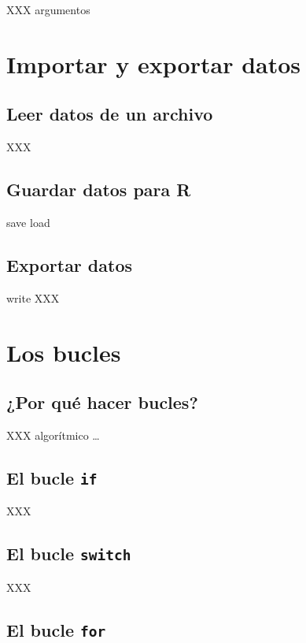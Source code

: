 \documentclass[]{book}
\begin{document}
XXX argumentos

\chapter{Importar y exportar datos}\label{import}

\section{Leer datos de un archivo}\label{leer-datos-de-un-archivo}

XXX

\section{Guardar datos para R}\label{guardar-datos-para-r}

save load

\section{Exportar datos}\label{exportar-datos}

write XXX

\chapter{Los bucles}\label{loops}

\section{¿Por qué hacer bucles?}\label{por-que-hacer-bucles}

XXX algorítmico \ldots{}

\section{\texorpdfstring{El bucle
\texttt{if}}{El bucle if}}\label{el-bucle-if}

XXX

\section{\texorpdfstring{El bucle
\texttt{switch}}{El bucle switch}}\label{el-bucle-switch}

XXX

\section{\texorpdfstring{El bucle
\texttt{for}}{El bucle for}}\label{el-bucle-for}
\end{document}
